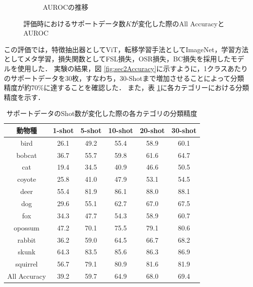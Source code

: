 \begin{figure}[tbp]
\begin{subfigure}[b]{0.45\linewidth}
    \caption{AUROCの推移}
    \label{fig:sec2AUROC}
  \end{subfigure}
  \caption{評価時におけるサポートデータ数$K$が変化した際のAll AccuracyとAUROC}
  \label{fig:k-shot}
\end{figure}
% 
この評価では，特徴抽出器としてViT，転移学習手法としてImageNet，学習方法としてメタ学習，損失関数としてFSL損失，OSR損失，BC損失を採用したモデルを使用した．
実験の結果，図 \ref{fig:sec2Accuracy}に示すように，1クラスあたりのサポートデータを30枚，すなわち，30-Shotまで増加させることによって分類精度が約70\%に達することを確認した．
また，表 \ref{tbl:shot}に各カテゴリーにおける分類精度を示す．

\begin{table}[tbp]
  \centering
  \caption{サポートデータのShot数が変化した際の各カテゴリの分類精度}
  \label{tbl:shot}
  \begin{tabular}{c||c|c|c|c|c}
      \hline
      動物種        & 1-shot & 5-shot & 10-shot & 20-shot & 30-shot \\ \hline\hline
      bird         & 26.1   & 49.2   & 55.4    & 58.9    & 60.1    \\
      bobcat       & 36.7   & 55.7   & 59.8    & 61.6    & 64.7    \\
      cat          & 19.4   & 34.5   & 40.9    & 46.6    & 50.5    \\
      coyote       & 25.8   & 41.0   & 47.9    & 53.1    & 54.5    \\
      deer         & 55.4   & 81.9   & 86.1    & 88.0    & 88.1    \\
      dog          & 29.6   & 55.1   & 62.7    & 67.0    & 67.5    \\
      fox          & 34.3   & 47.7   & 54.3    & 58.9    & 60.7    \\
      opossum      & 47.2   & 70.1   & 75.5    & 79.1    & 80.6    \\
      rabbit       & 36.2   & 59.0   & 64.5    & 66.7    & 68.2    \\
      skunk        & 64.3   & 83.5   & 85.6    & 86.3    & 86.9    \\
      squirrel     & 56.7   & 79.1   & 80.9    & 81.6    & 81.9    \\ \hline\hline
      All Accuracy & 39.2   & 59.7   & 64.9    & 68.0    & 69.4    \\ \hline
  \end{tabular}
\end{table}

